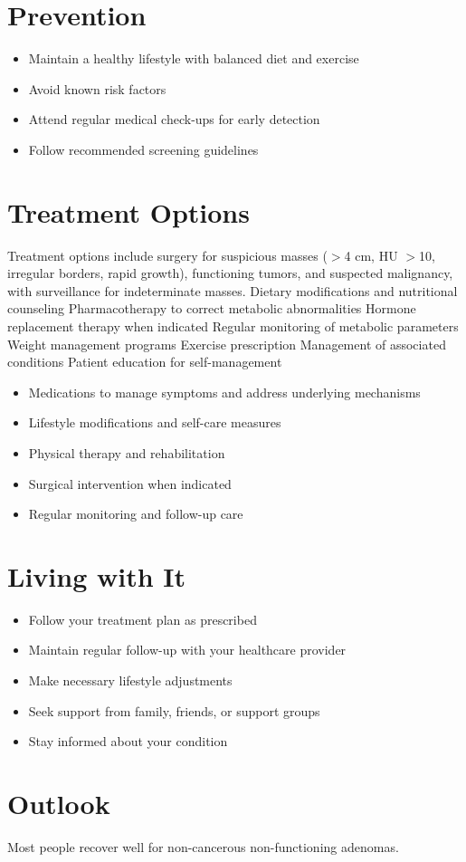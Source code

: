 \section{Prevention}
\begin{itemize}[noitemsep]
  \item Maintain a healthy lifestyle with balanced diet and exercise
  \item Avoid known risk factors
  \item Attend regular medical check-ups for early detection
  \item Follow recommended screening guidelines
\end{itemize}
\section{Treatment Options}
Treatment options include surgery for suspicious masses ($>$4 cm, HU $>$10, irregular borders, rapid growth), functioning tumors, and suspected malignancy, with surveillance for indeterminate masses. Dietary modifications and nutritional counseling Pharmacotherapy to correct metabolic abnormalities Hormone replacement therapy when indicated Regular monitoring of metabolic parameters Weight management programs Exercise prescription Management of associated conditions Patient education for self-management

\begin{itemize}[noitemsep]
  \item Medications to manage symptoms and address underlying mechanisms
  \item Lifestyle modifications and self-care measures
  \item Physical therapy and rehabilitation
  \item Surgical intervention when indicated
  \item Regular monitoring and follow-up care
\end{itemize}
\section{Living with It}
\begin{itemize}[noitemsep]
  \item Follow your treatment plan as prescribed
  \item Maintain regular follow-up with your healthcare provider
  \item Make necessary lifestyle adjustments
  \item Seek support from family, friends, or support groups
  \item Stay informed about your condition
\end{itemize}
\section{Outlook}
Most people recover well for non-cancerous non-functioning adenomas.
